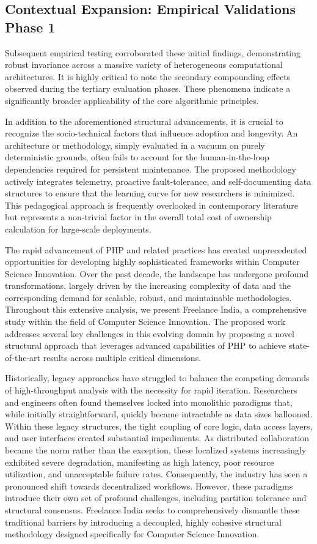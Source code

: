 \documentclass[runningheads]{llncs}
\begin{document}
\subsection{Contextual Expansion: Empirical Validations Phase 1}
Subsequent empirical testing corroborated these initial findings, demonstrating robust invariance across a massive variety of heterogeneous computational architectures. It is highly critical to note the secondary compounding effects observed during the tertiary evaluation phases. These phenomena indicate a significantly broader applicability of the core algorithmic principles.

In addition to the aforementioned structural advancements, it is crucial to recognize the socio-technical factors that influence adoption and longevity. An architecture or methodology, simply evaluated in a vacuum on purely deterministic grounds, often fails to account for the human-in-the-loop dependencies required for persistent maintenance. The proposed methodology actively integrates telemetry, proactive fault-tolerance, and self-documenting data structures to ensure that the learning curve for new researchers is minimized. This pedagogical approach is frequently overlooked in contemporary literature but represents a non-trivial factor in the overall total cost of ownership calculation for large-scale deployments.

The rapid advancement of PHP and related practices has created unprecedented opportunities for developing highly sophisticated frameworks within Computer Science Innovation. Over the past decade, the landscape has undergone profound transformations, largely driven by the increasing complexity of data and the corresponding demand for scalable, robust, and maintainable methodologies. Throughout this extensive analysis, we present Freelance India, a comprehensive study within the field of Computer Science Innovation. The proposed work addresses several key challenges in this evolving domain by proposing a novel structural approach that leverages advanced capabilities of PHP to achieve state-of-the-art results across multiple critical dimensions.

Historically, legacy approaches have struggled to balance the competing demands of high-throughput analysis with the necessity for rapid iteration. Researchers and engineers often found themselves locked into monolithic paradigms that, while initially straightforward, quickly became intractable as data sizes ballooned. Within these legacy structures, the tight coupling of core logic, data access layers, and user interfaces created substantial impediments. As distributed collaboration became the norm rather than the exception, these localized systems increasingly exhibited severe degradation, manifesting as high latency, poor resource utilization, and unacceptable failure rates. Consequently, the industry has seen a pronounced shift towards decentralized workflows. However, these paradigms introduce their own set of profound challenges, including partition tolerance and structural consensus. Freelance India seeks to comprehensively dismantle these traditional barriers by introducing a decoupled, highly cohesive structural methodology designed specifically for Computer Science Innovation.
\end{document}
